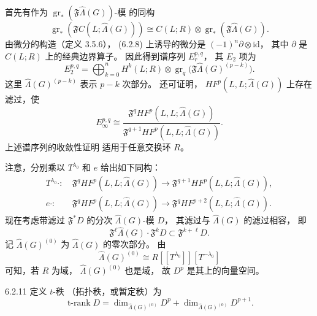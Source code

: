 首先有作为
$\operatorname{gr}_*(\mathfrak F\widehat\Lambda(G))$-模
的同构
\begin{equation}
\operatorname{gr}_*
(\mathfrak F C(L;\widehat\Lambda(G)))
\cong C(L;R)\otimes
\operatorname{gr}_*
(\mathfrak F\widehat\Lambda(G)).
\tag{6.2.8}\label{eq:6-2-8}
\end{equation}
由微分的构造（定义 3.5.6），
(6.2.8) 上诱导的微分是
$(-1)^n\partial\otimes\mathrm{id}$，
其中 $\partial$ 是 $C(L;R)$
上的经典边界算子。
因此得到谱序列 $E_r^{p,q}$，
其 $E_2$ 项为
\begin{equation}
E_2^{p,q}
=\bigoplus_{k=0}^{n}
H^k(L;R)\otimes
\operatorname{gr}_q
\bigl(\mathfrak F
\widehat\Lambda(G)^{(p-k)}\bigr).
\tag{6.2.9}\label{eq:6-2-9}
\end{equation}
这里 $\widehat\Lambda(G)^{(p-k)}$
表示 $p-k$ 次部分。
还可证明，
$HF^p(L,L;\widehat\Lambda(G))$
上存在滤过，使
\begin{equation}
E_\infty^{p,q}
\cong
\frac{\mathfrak F^q
HF^p(L,L;\widehat\Lambda(G))}
{\mathfrak F^{q+1}
HF^p(L,L;\widehat\Lambda(G))}.
\tag{6.2.10}\label{eq:6-2-10}
\end{equation}
上述谱序列的收敛性证明
适用于任意交换环 $R$。

注意，分别乘以
$T^{\lambda_0}$ 和 $e$
给出如下同构：
\[
\begin{aligned}
T^{\lambda_0}\cdot:
&\ \mathfrak F^qHF^p(L,L;\widehat\Lambda(G))
\longrightarrow
\mathfrak F^{q+1}HF^p(L,L;\widehat\Lambda(G)),\\
e\cdot:
&\ \mathfrak F^qHF^p(L,L;\widehat\Lambda(G))
\longrightarrow
\mathfrak F^qHF^{p+2}(L,L;\widehat\Lambda(G)).
\end{aligned}
\]
现在考虑带滤过 $\mathfrak F^*D$
的分次 $\widehat\Lambda(G)$-模 $D$，
其滤过与 $\widehat\Lambda(G)$ 的滤过相容，
即
\[
\mathfrak F^\ell\widehat\Lambda(G)
\cdot\mathfrak F^kD
\subset\mathfrak F^{k+\ell}D.
\]
记 $\widehat\Lambda(G)^{(0)}$
为 $\widehat\Lambda(G)$ 的零次部分。
由
\[
\widehat\Lambda(G)^{(0)}
\cong R[[T^{\lambda_0}]][T^{-\lambda_0}]
\]
可知，若 $R$ 为域，
$\widehat\Lambda(G)^{(0)}$ 也是域，
故 $D^p$ 是其上的向量空间。

\begin{definition}{6.2.11}\label{def:6-2-11}
定义 $t$-秩
（拓扑秩，或暂定秩）为
\[
\operatorname{t-rank}D
=\dim_{\widehat\Lambda(G)^{(0)}}D^p
+\dim_{\widehat\Lambda(G)^{(0)}}D^{p+1}.
\]
\end{definition}

